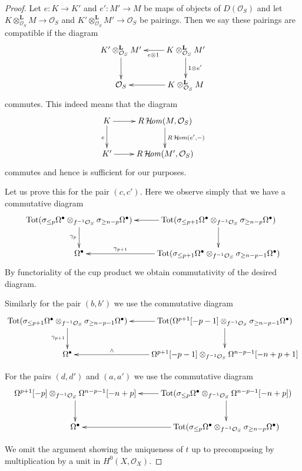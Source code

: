 \begin{proof}
\medskip\noindent
Let $e : K \to K'$ and $e' : M' \to M$ be maps of objects
of $D(\mathcal{O}_S)$ and let
$K \otimes_{\mathcal{O}_S}^\mathbf{L} M \to \mathcal{O}_S$ and
$K' \otimes_{\mathcal{O}_S}^\mathbf{L} M' \to \mathcal{O}_S$
be pairings. Then we say these pairings are compatible if the
diagram
$$
\xymatrix{
K' \otimes_{\mathcal{O}_S}^\mathbf{L} M' \ar[d] &
K \otimes_{\mathcal{O}_S}^\mathbf{L} M'
\ar[l]^{e \otimes 1} \ar[d]^{1 \otimes e'} \\
\mathcal{O}_S &
K \otimes_{\mathcal{O}_S}^\mathbf{L} M \ar[l]
}
$$
commutes. This indeed means that the diagram
$$
\xymatrix{
K \ar[r] \ar[d]_e & R\SheafHom(M, \mathcal{O}_S) \ar[d]^{R\SheafHom(e', -)} \\
K' \ar[r] & R\SheafHom(M', \mathcal{O}_S)
}
$$
commutes and hence is sufficient for our purposes.

\medskip\noindent
Let us prove this for the pair $(c, c')$. Here we observe simply
that we have a commutative diagram
$$
\xymatrix{
\text{Tot}(\sigma_{\leq p} \Omega^\bullet \otimes_{f^{-1}\mathcal{O}_S}
\sigma_{\geq n - p} \Omega^\bullet) \ar[d]_{\gamma_p} &
\text{Tot}(\sigma_{\leq p + 1} \Omega^\bullet \otimes_{f^{-1}\mathcal{O}_S}
\sigma_{\geq n - p} \Omega^\bullet) \ar[l] \ar[d] \\
\Omega^\bullet &
\text{Tot}(\sigma_{\leq p + 1} \Omega^\bullet \otimes_{f^{-1}\mathcal{O}_S}
\sigma_{\geq n - p - 1} \Omega^\bullet) \ar[l]_-{\gamma_{p + 1}}
}
$$
By functoriality of the cup product we obtain commutativity of the
desired diagram.

\medskip\noindent
Similarly for the pair $(b, b')$ we use the commutative diagram
$$
\xymatrix{
\text{Tot}(\sigma_{\leq p + 1} \Omega^\bullet \otimes_{f^{-1}\mathcal{O}_S}
\sigma_{\geq n - p - 1} \Omega^\bullet) \ar[d]_{\gamma_{p + 1}} &
\text{Tot}(\Omega^{p + 1}[-p - 1] \otimes_{f^{-1}\mathcal{O}_S}
\sigma_{\geq n - p - 1} \Omega^\bullet) \ar[l] \ar[d] \\
\Omega^\bullet &
\Omega^{p + 1}[-p - 1]
\otimes_{f^{-1}\mathcal{O}_S}
\Omega^{n - p - 1}[-n + p + 1] \ar[l]_-\wedge
}
$$

\medskip\noindent
For the pairs $(d, d')$ and $(a, a')$ we use the commutative diagram
$$
\xymatrix{
\Omega^{p + 1}[-p] \otimes_{f^{-1}\mathcal{O}_S}
\Omega^{n - p - 1}[-n + p] \ar[d] &
\text{Tot}(\sigma_{\leq p}\Omega^\bullet \otimes_{f^{-1}\mathcal{O}_S}
\Omega^{n - p - 1}[-n + p]) \ar[l] \ar[d] \\
\Omega^\bullet &
\text{Tot}(\sigma_{\leq p}\Omega^\bullet \otimes_{f^{-1}\mathcal{O}_S}
\sigma_{\geq n - p}\Omega^\bullet) \ar[l]
}
$$

\medskip\noindent
We omit the argument showing the uniqueness of $t$ up to
precomposing by multiplication by a unit in $H^0(X, \mathcal{O}_X)$.
\end{proof}

















